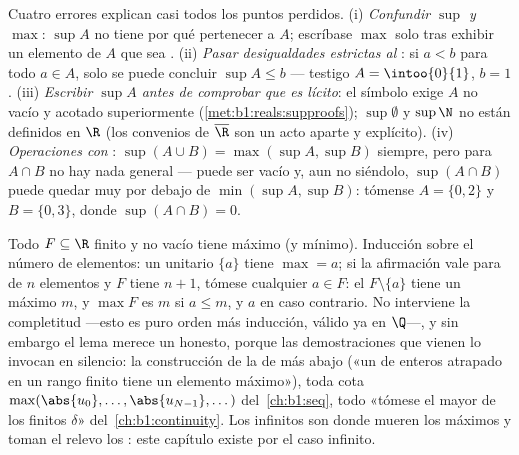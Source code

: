 \begin{remark}
Cuatro errores explican casi todos los puntos perdidos. (i)
\emph{Confundir $\sup$ y $\max$}: $\sup A$ no tiene por qué pertenecer
a $A$; escríbase $\max$ solo tras exhibir un elemento de $A$ que sea
. (ii) \emph{Pasar desigualdades estrictas al
}: si $a < b$ para todo $a \in A$, solo se puede concluir
$\sup A \leq b$ --- testigo $A = \intoo{0}{1}$, $b = 1$. (iii)
\emph{Escribir $\sup A$ antes de comprobar que es lícito}: el símbolo
exige $A$ no vacío y acotado superiormente
(\cref{met:b1:reals:supproofs}); $\sup \emptyset$ y $\sup \N$ no están
definidos en $\R$ (los convenios de $\overline\R$ son un acto aparte y
explícito). (iv) \emph{Operaciones con }:
$\sup(A \cup B) = \max(\sup A, \sup B)$ siempre, pero para $A \cap B$
no hay nada general --- puede ser vacío y, aun no siéndolo,
$\sup(A \cap B)$ puede quedar muy por debajo de $\min(\sup A, \sup B)$:
tómense $A = \{0, 2\}$ y $B = \{0, 3\}$, donde $\sup(A \cap B) = 0$.
\end{remark}

\begin{example}\label{ex:b1:reals:finitemax}
Todo $F \subseteq \R$ finito y no vacío tiene máximo (y mínimo).
Inducción sobre el número de elementos: un  unitario $\{a\}$
tiene $\max = a$; si la afirmación vale para  de $n$ elementos
y $F$ tiene $n + 1$, tómese cualquier $a \in F$: el 
$F \setminus \{a\}$ tiene un máximo $m$, y $\max F$ es $m$ si
$a \leq m$, y $a$ en caso contrario. No interviene la completitud
---esto es puro orden más inducción, válido ya en $\Q$---, y sin
embargo el lema merece un  honesto, porque las demostraciones
que vienen lo invocan en silencio: la construcción de la 
de más abajo («un  de enteros atrapado en un rango finito tiene
un elemento máximo»), toda cota $\max(\abs{u_0}, \dots, \abs{u_{N-1}},
\dots)$ del~\cref{ch:b1:seq}, todo «tómese el mayor de los finitos
$\delta$» del~\cref{ch:b1:continuity}. Los  infinitos son donde
mueren los máximos y toman el relevo los : este capítulo existe
por el caso infinito.
\end{example}

